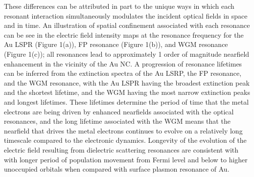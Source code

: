 \documentclass[journal=jpclcd,manuscript=letter]{achemso}
\begin{document}
These differences can be attributed in part to the unique ways in which each resonant interaction simultaneously modulates the incident optical
fields in space and in time. An illustration of spatial confinement associated with each resonance can be see in the 
electric field intensity maps at the resonance frequency for the 
Au LSPR (Figure 1(a)), FP resonance (Figure 1(b)), and WGM resonance (Figure 1(c)); all resonances lead to approximately 1 order of
magnitude nearfield enhancement in the vicinity of the Au NC.
A progression of resonance lifetimes can be inferred from the extinction spectra of the Au LSRP, the FP resonance, and the WGM resonance, with
the Au LSPR having the broadest extinction peak and the shortest lifetime, and the WGM having the most narrow extinction peaks and longest lifetimes.  These
lifetimes determine the period of time that the metal electrons are being driven by enhanced nearfields associated with the optical resonances, and
the long lifetime associated with the WGM means that the nearfield that drives the metal electrons continues to evolve on a relatively long timescale compared
to the electronic dynamics.
Longevity of the evolution of the electric field resulting from dielectric scattering resonances are consistent with
with longer period of population movement from Fermi level and below to higher unoccupied orbitals when compared with surface plasmon
resonance of Au.
\end{document}
